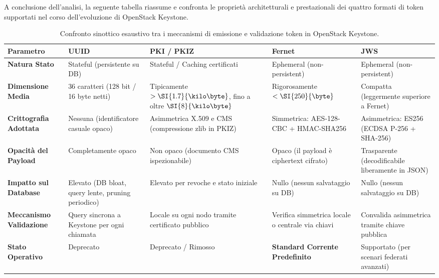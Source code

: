 \documentclass[11pt, a4paper]{article}
\begin{document}
A conclusione dell'analisi, la seguente tabella riassume e confronta le proprietà architetturali e prestazionali dei quattro formati di token supportati nel corso dell'evoluzione di OpenStack Keystone.

\begin{table}[H]
\centering
\small
\begin{tabularx}{\textwidth}{p{2.3cm} p{2.8cm} p{3.2cm} p{2.8cm} X}
\toprule
\textbf{Parametro} & \textbf{UUID} & \textbf{PKI / PKIZ} & \textbf{Fernet} & \textbf{JWS} \\
\midrule
\textbf{Natura Stato} & Stateful (persistente su DB) & Stateful / Caching certificati & Ephemeral (non-persistent) & Ephemeral (non-persistent) \\
\midrule
\textbf{Dimensione Media} & 36 caratteri (128 bit / 16 byte netti) & Tipicamente $> \SI{1.7}{\kilo\byte}$, fino a oltre $\SI{8}{\kilo\byte}$ & Rigorosamente $< \SI{250}{\byte}$ & Compatta (leggermente superiore a Fernet) \\
\midrule
\textbf{Crittografia Adottata} & Nessuna (identificatore casuale opaco) & Asimmetrica X.509 e CMS (compressione zlib in PKIZ) & Simmetrica: AES-128-CBC + HMAC-SHA256 & Asimmetrica: ES256 (ECDSA P-256 + SHA-256) \\
\midrule
\textbf{Opacità del Payload} & Completamente opaco & Non opaco (documento CMS ispezionabile) & Opaco (il payload è ciphertext cifrato) & Trasparente (decodificabile liberamente in JSON) \\
\midrule
\textbf{Impatto sul Database} & Elevato (DB bloat, query lente, pruning periodico) & Elevato per revoche e stato iniziale & Nullo (nessun salvataggio su DB) & Nullo (nessun salvataggio su DB) \\
\midrule
\textbf{Meccanismo Validazione} & Query sincrona a Keystone per ogni chiamata & Locale su ogni nodo tramite certificato pubblico & Verifica simmetrica locale o centrale via chiavi & Convalida asimmetrica tramite chiave pubblica \\
\midrule
\textbf{Stato Operativo} & Deprecato & Deprecato / Rimosso & \textbf{Standard Corrente Predefinito} & Supportato (per scenari federati avanzati) \\
\bottomrule
\end{tabularx}
\caption{Confronto sinottico esaustivo tra i meccanismi di emissione e validazione token in OpenStack Keystone.}
\end{table}

\end{document}
